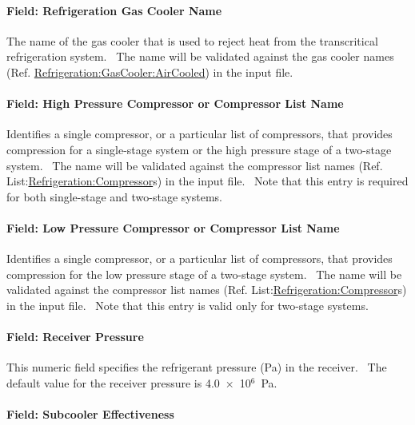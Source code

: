 \paragraph{Field: Refrigeration Gas Cooler Name}\label{field-refrigeration-gas-cooler-name}

The name of the gas cooler that is used to reject heat from the transcritical refrigeration system.~ The name will be validated against the gas cooler names (Ref. \hyperref[refrigerationgascooleraircooled]{Refrigeration:GasCooler:AirCooled}) in the input file.

\paragraph{Field: High Pressure Compressor or Compressor List Name}\label{field-high-pressure-compressor-or-compressor-list-name}

Identifies a single compressor, or a particular list of compressors, that provides compression for a single-stage system or the high pressure stage of a two-stage system.~ The name will be validated against the compressor list names (Ref. List:\hyperref[refrigerationcompressor]{Refrigeration:Compressor}s) in the input file.~ Note that this entry is required for both single-stage and two-stage systems.

\paragraph{Field: Low Pressure Compressor or Compressor List Name}\label{field-low-pressure-compressor-or-compressor-list-name}

Identifies a single compressor, or a particular list of compressors, that provides compression for the low pressure stage of a two-stage system.~ The name will be validated against the compressor list names (Ref. List:\hyperref[refrigerationcompressor]{Refrigeration:Compressor}s) in the input file.~ Note that this entry is valid only for two-stage systems.

\paragraph{Field: Receiver Pressure}\label{field-receiver-pressure}

This numeric field specifies the refrigerant pressure (Pa) in the receiver.~ The default value for the receiver pressure is 4.0~×~10\(^{6}\)~Pa.

\paragraph{Field: Subcooler Effectiveness}\label{field-subcooler-effectiveness}

